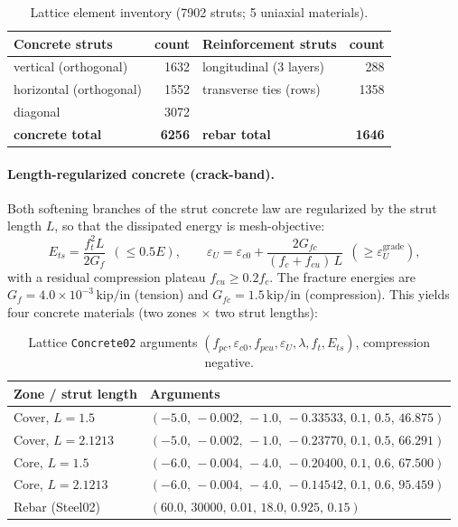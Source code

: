 \documentclass[11pt]{article}
\newcommand{\unit}[1]{\,\mathrm{#1}}
\newcommand{\code}[1]{\texttt{#1}}
\begin{document}
\begin{table}[H]
\centering
\caption{Lattice element inventory (7902 struts; 5 uniaxial materials).}
\begin{tabular}{l r l r}
\toprule
Concrete struts & count & Reinforcement struts & count \\
\midrule
vertical (orthogonal)   & 1632 & longitudinal (3 layers)       & 288 \\
horizontal (orthogonal) & 1552 & transverse ties (rows)        & 1358 \\
diagonal                & 3072 & & \\
\midrule
\textbf{concrete total} & \textbf{6256} & \textbf{rebar total} & \textbf{1646} \\
\bottomrule
\end{tabular}
\end{table}

\paragraph{Length-regularized concrete (crack-band).}
Both softening branches of the strut concrete law are regularized by the strut length $L$, so
that the dissipated energy is mesh-objective:
\[
E_{ts}=\frac{f_t^2 L}{2G_f}\ \ (\le 0.5E),
\qquad
\varepsilon_{U}=\varepsilon_{c0}+\frac{2G_{fc}}{(f_c+f_{cu})\,L}\ \ (\ge \varepsilon_U^{\text{grade}}),
\]
with a residual compression plateau $f_{cu}\ge 0.2 f_c$. The fracture energies are
$G_f = 4.0\times10^{-3}\unit{kip/in}$ (tension) and $G_{fc}=1.5\unit{kip/in}$ (compression).
This yields four concrete materials (two zones $\times$ two strut lengths):

\begin{table}[H]
\centering
\caption{Lattice \code{Concrete02} arguments
$(f_{pc},\varepsilon_{c0},f_{pcu},\varepsilon_{U},\lambda,f_t,E_{ts})$, compression negative.}
\begin{tabular}{l l}
\toprule
Zone / strut length & Arguments \\
\midrule
Cover, $L=1.5$    & $(-5.0,\,-0.002,\,-1.0,\,-0.33533,\,0.1,\,0.5,\,46.875)$ \\
Cover, $L=2.1213$ & $(-5.0,\,-0.002,\,-1.0,\,-0.23770,\,0.1,\,0.5,\,66.291)$ \\
Core,  $L=1.5$    & $(-6.0,\,-0.004,\,-4.0,\,-0.20400,\,0.1,\,0.6,\,67.500)$ \\
Core,  $L=2.1213$ & $(-6.0,\,-0.004,\,-4.0,\,-0.14542,\,0.1,\,0.6,\,95.459)$ \\
Rebar (Steel02)   & $(60.0,\,30000,\,0.01,\,18.0,\,0.925,\,0.15)$ \\
\bottomrule
\end{tabular}
\end{table}
\end{document}
